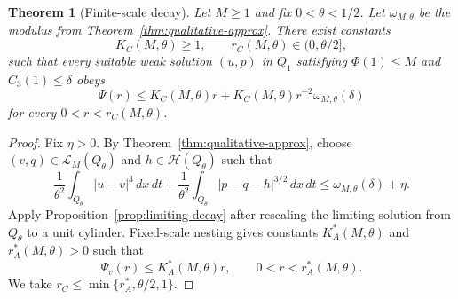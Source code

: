 \documentclass[pdflatex,sn-mathphys-num]{sn-jnl}
\numberwithin{equation}{section}
\theoremstyle{thmstyleone}
\newtheorem{theorem}{Theorem}[section]
\theoremstyle{thmstylethree}
\newcommand{\dxdt}{\,dx\,dt}
\newcommand{\calH}{\mathcal H}
\newcommand{\calL}{\mathcal L}
\begin{document}
\begin{theorem}[Finite-scale decay]
\label{thm:finite-decay-proof}
Let \(M\ge1\) and fix \(0<\theta<1/2\).  Let \(\omega_{M,\theta}\) be the modulus from Theorem~\ref{thm:qualitative-approx}.  There exist constants
\[
        K_C(M,\theta)\ge1,
        \qquad
        r_C(M,\theta)\in(0,\theta/2],
\]
such that every suitable weak solution \((u,p)\) in \(Q_1\) satisfying \(\Phi(1)\le M\) and \(C_3(1)\le\delta\) obeys
\begin{equation}
        \Psi(r)
        \le K_C(M,\theta)r+K_C(M,\theta)r^{-2}\omega_{M,\theta}(\delta)
        \label{eq:finite-decay}
\end{equation}
for every \(0<r<r_C(M,\theta)\).
\end{theorem}

\begin{proof}
Fix \(\eta>0\).  By Theorem~\ref{thm:qualitative-approx}, choose \((v,q)\in\calL_M(Q_\theta)\) and \(h\in\calH(Q_\theta)\) such that
\begin{equation}
\frac1{\theta^2}\int_{Q_\theta}|u-v|^3\dxdt
+
\frac1{\theta^2}\int_{Q_\theta}|p-q-h|^{3/2}\dxdt
\le \omega_{M,\theta}(\delta)+\eta.
\label{eq:chosen-comparison}
\end{equation}
Apply Proposition~\ref{prop:limiting-decay} after rescaling the limiting solution from \(Q_\theta\) to a unit cylinder.  Fixed-scale nesting gives constants \(K_A^*(M,\theta)\) and \(r_A^*(M,\theta)>0\) such that
\begin{equation}
        \Psi_v(r)
        \le K_A^*(M,\theta)r,
        \qquad
        0<r<r_A^*(M,\theta).
        \label{eq:limiting-rescaled-decay}
\end{equation}
We take \(r_C\le\min\{r_A^*,\theta/2,1\}\).


\end{proof}
\end{document}
